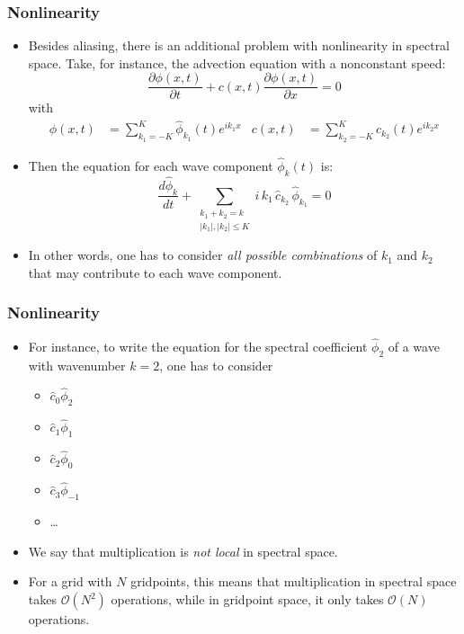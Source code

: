 \documentclass[aspectratio=149,9pt]{beamer}
\begin{document}
\begin{frame}
	\frametitle{Nonlinearity}
	\vfill\begin{itemize}
		\item Besides aliasing, there is an additional problem with nonlinearity in spectral space. Take, for instance, the advection equation with a nonconstant speed:
			\begin{equation*}
				\frac{\partial \phi(x,t)}{\partial t}+c(x,t)\frac{\partial \phi(x,t)}{\partial x}=0
			\end{equation*}
			with
			\begin{align*}
				 \phi(x,t) &= \sum_{k_1=-K}^K \hat\phi_{k_1} (t) e^{ik_1x}	&	c(x,t) &= \sum_{k_2=-K}^K \hat c_{k_2} (t) e^{ik_2x}
			\end{align*}\vfill
		\item Then the equation for each wave component $\hat\phi_k(t)$ is:
			\begin{equation*}
				\frac{ d \hat\phi_{k}}{dt} + \sum_{\begin{array}{c} k_1+k_2=k \\ |k_1|,|k_2|\le K \end{array} } i\,k_1\,\hat c_{k_2}\,\hat\phi_{k_1} = 0
			\end{equation*}\vfill
		\item In other words, one has to consider \emph{all possible combinations} of $k_1$ and $k_2$ that may contribute to each wave component.
	\end{itemize}\vfill
\end{frame}
%
%
\begin{frame}
	\frametitle{Nonlinearity}
	\vfill\begin{itemize}
		\item For instance, to write the equation for the spectral coefficient $\hat\phi_2$ of a wave with wavenumber $k=2$, one has to consider
			\begin{itemize}
				\item $\hat c_0	\hat \phi_2$
				\item $\hat c_1 \hat\phi_1$
				\item $\hat c_2 \hat\phi_0$
				\item $\hat c_3 \hat\phi_{-1}$
				\item \ldots
			\end{itemize}\vfill
		\item We say that multiplication is \emph{not local} in spectral space.\vfill
\pause
		\item For a grid with $N$ gridpoints, this means that multiplication in spectral space takes $\mathcal{O}(N^2)$ operations, while in gridpoint space, it only takes $\mathcal{O}(N)$ operations.
	\end{itemize}\vfill
\end{frame}
\end{document}
